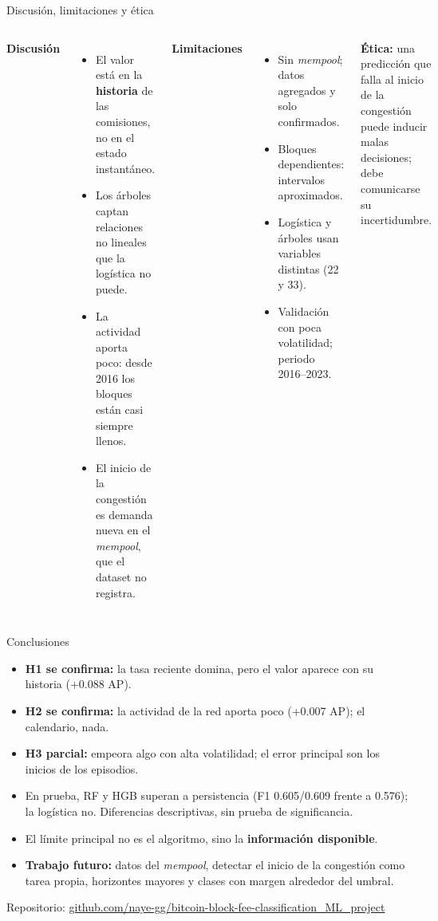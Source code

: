 \documentclass[aspectratio=169,11pt]{beamer}
\begin{document}
\begin{frame}{Discusión, limitaciones y ética}
\begin{columns}[T]
\small
\textbf{Discusión}
\begin{itemize}
\item El valor está en la \textbf{historia} de las comisiones, no en el estado instantáneo.
\item Los árboles captan relaciones no lineales que la logística no puede.
\item La actividad aporta poco: desde 2016 los bloques están casi siempre llenos.
\item El inicio de la congestión es demanda nueva en el \textit{mempool}, que el dataset no registra.
\end{itemize}
\small
\textbf{Limitaciones}
\begin{itemize}
\item Sin \textit{mempool}; datos agregados y solo confirmados.
\item Bloques dependientes: intervalos aproximados.
\item Logística y árboles usan variables distintas (22 y 33).
\item Validación con poca volatilidad; periodo 2016--2023.
\end{itemize}
\textbf{Ética:} una predicción que falla al inicio de la congestión puede inducir malas decisiones; debe comunicarse su incertidumbre.
\end{columns}
\end{frame}

\begin{frame}{Conclusiones}
\begin{itemize}
\item \textbf{H1 se confirma:} la tasa reciente domina, pero el valor aparece con su historia (+0.088 AP).
\item \textbf{H2 se confirma:} la actividad de la red aporta poco (+0.007 AP); el calendario, nada.
\item \textbf{H3 parcial:} empeora algo con alta volatilidad; el error principal son los inicios de los episodios.
\item En prueba, RF y HGB superan a persistencia (F1 0.605/0.609 frente a 0.576); la logística no. Diferencias descriptivas, sin prueba de significancia.
\item El límite principal no es el algoritmo, sino la \textbf{información disponible}.
\item \textbf{Trabajo futuro:} datos del \textit{mempool}, detectar el inicio de la congestión como tarea propia, horizontes mayores y clases con margen alrededor del umbral.
\end{itemize}
\vspace{0.3cm}
\centering\small Repositorio: \url{github.com/naye-gg/bitcoin-block-fee-classification_ML_project}
\end{frame}
\end{document}
